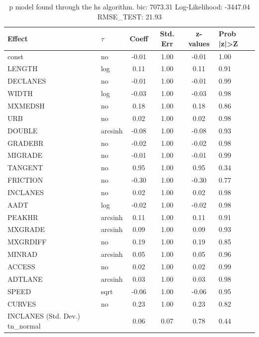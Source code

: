 \begin{table}
	\caption{p model found through the hs algorithm. bic: 7073.31 Log-Likelihood: -3447.04 RMSE_TEST: 21.93}
	\begin{center}
		\begin{tabular}{|l|l|c|c|c|l|}
			\hline
			Effect & $\tau$ & Coeff & Std. Err & z-values & Prob |z|>Z \\
			\hline
			const & no & -0.01 & 1.00 & -0.01 & 1.00 \\
			\hline
			LENGTH & log & 0.11 & 1.00 & 0.11 & 0.91 \\
			\hline
			DECLANES & no & -0.01 & 1.00 & -0.01 & 0.99 \\
			\hline
			WIDTH & log & -0.03 & 1.00 & -0.03 & 0.98 \\
			\hline
			MXMEDSH & no & 0.18 & 1.00 & 0.18 & 0.86 \\
			\hline
			URB & no & 0.02 & 1.00 & 0.02 & 0.98 \\
			\hline
			DOUBLE & arcsinh & -0.08 & 1.00 & -0.08 & 0.93 \\
			\hline
			GRADEBR & no & -0.02 & 1.00 & -0.02 & 0.98 \\
			\hline
			MIGRADE & no & -0.01 & 1.00 & -0.01 & 0.99 \\
			\hline
			TANGENT & no & 0.95 & 1.00 & 0.95 & 0.34 \\
			\hline
			FRICTION & no & -0.30 & 1.00 & -0.30 & 0.77 \\
			\hline
			INCLANES & no & 0.02 & 1.00 & 0.02 & 0.98 \\
			\hline
			AADT & log & -0.02 & 1.00 & -0.02 & 0.98 \\
			\hline
			PEAKHR & arcsinh & 0.11 & 1.00 & 0.11 & 0.91 \\
			\hline
			MXGRADE & arcsinh & 0.09 & 1.00 & 0.09 & 0.93 \\
			\hline
			MXGRDIFF & no & 0.19 & 1.00 & 0.19 & 0.85 \\
			\hline
			MINRAD & arcsinh & 0.05 & 1.00 & 0.05 & 0.96 \\
			\hline
			ACCESS & no & 0.02 & 1.00 & 0.02 & 0.99 \\
			\hline
			ADTLANE & arcsinh & 0.03 & 1.00 & 0.03 & 0.98 \\
			\hline
			SPEED & sqrt & -0.06 & 1.00 & -0.06 & 0.95 \\
			\hline
			CURVES & no & 0.23 & 1.00 & 0.23 & 0.82 \\
			\hline
			INCLANES (Std. Dev.) tn_normal &  & 0.06 & 0.07 & 0.78 & 0.44 \\
			\hline

\end{tabular}
\end{center}
\end{table}
